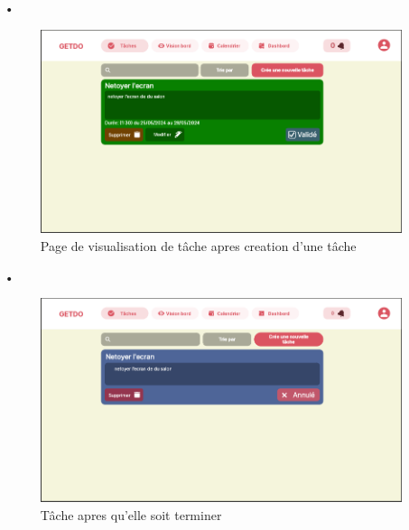 \documentclass[a4paper,12pt]{report}
\begin{document}
\begin{itemize}
      \item[•]\begin{figure}[h!]
          \includegraphics[width=1\textwidth]{./images/getdo_screenshot/getdo_task.png}
          \caption{Page de visualisation de tâche apres creation d'une tâche}
          \label{fig:jira_project_task}
        \end{figure}
        
      \item[•]\begin{figure}[h!]
          \includegraphics[width=1\textwidth]{./images/getdo_screenshot/getdo_task_finish.png}
          \caption{Tâche apres qu'elle soit terminer}
          \label{fig:jira_project_task}
        \end{figure}
        

\end{itemize}
\end{document}
